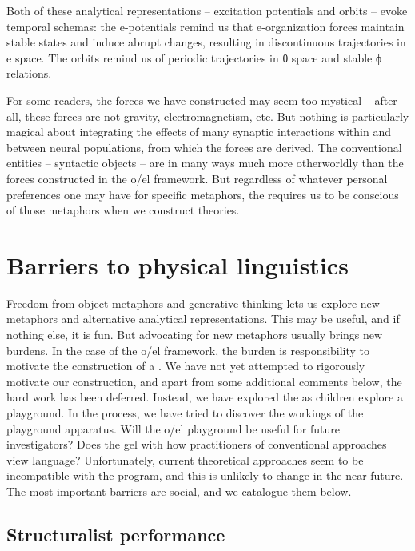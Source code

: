   Both of these analytical representations -- excitation potentials and orbits -- evoke temporal schemas: the e-potentials remind us that e-organization forces maintain stable states and induce abrupt changes, resulting in discontinuous trajectories in e space. The orbits remind us of periodic trajectories in θ space and stable ϕ relations.

  For some readers, the forces we have constructed may seem too mystical -- after all, these forces are not gravity, electromagnetism, etc. But nothing is particularly magical about integrating the effects of many synaptic interactions within and between neural populations, from which the forces are derived. The conventional entities -- syntactic objects -- are in many ways much more otherworldly than the forces constructed in the o/el framework. But regardless of whatever personal preferences one may have for specific metaphors, the  requires us to be conscious of those metaphors when we construct theories.

\section{Barriers to physical linguistics}

Freedom from object metaphors and generative thinking lets us explore new metaphors and alternative analytical representations. This may be useful, and if nothing else, it is fun. But advocating for new metaphors usually brings new burdens. In the case of the o/el framework, the burden is responsibility to motivate the construction of a . We have not yet attempted to rigorously motivate our  construction, and apart from some additional comments below, the hard work has been deferred. Instead, we have explored the  as children explore a playground. In the process, we have tried to discover the workings of the playground apparatus. Will the o/el playground be useful for future investigators? Does the  gel with how practitioners of conventional approaches view language? Unfortunately, current theoretical approaches seem to be incompatible with the  program, and this is unlikely to change in the near future. The most important barriers are social, and we catalogue them below.

\subsection{Structuralist performance}


